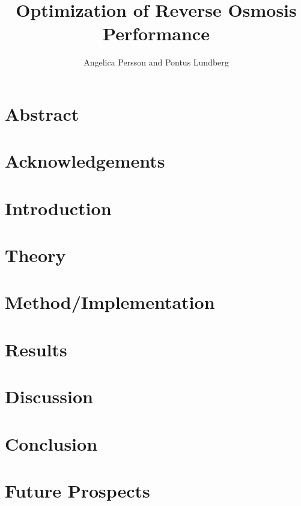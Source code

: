 \documentclass{LTHthesis}
\begin{document}
\begin{titlepages}
\author{Angelica Persson and Pontus Lundberg}
\title{Optimization of Reverse Osmosis Performance}
\end{titlepages}
\chapter{Abstract}

\chapter{Acknowledgements}


\tableofcontents



\chapter{Introduction}


\chapter{Theory}


\chapter{Method/Implementation}


\chapter{Results}


\chapter{Discussion}


\chapter{Conclusion}


\chapter{Future Prospects}

\end{document}
